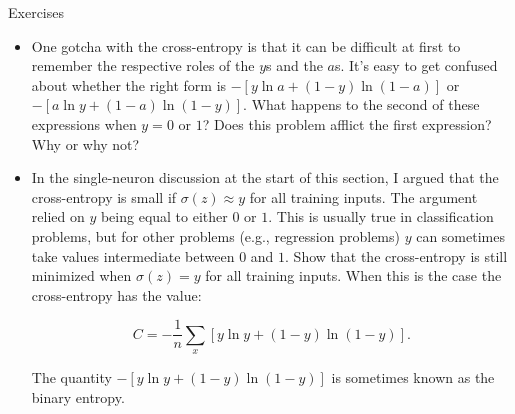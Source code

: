 \begin{exerciseBox}{Exercises}


\begin{itemize}

\item One gotcha with the cross-entropy is that it can be difficult at first to remember the respective roles of the $y$s and the $a$s. It's easy to get confused about whether the right form is $-[y \ln a + (1-y) \ln (1-a)]$ or $-[a \ln y + (1-a) \ln (1-y)]$. What happens to the second of these expressions when $y = 0$ or $1$? Does this problem afflict the first expression? Why or why not?

\item 
In the single-neuron discussion at the start of this section, I argued that the cross-entropy is small if $\sigma(z) \approx y$ for all training inputs. The argument relied on $y$ being equal to either $0$ or $1$. This is usually true in classification problems, but for other problems (e.g., regression problems) $y$ can sometimes take values intermediate between $0$ and $1$. Show that the cross-entropy is still minimized when $\sigma(z) = y$ for all training inputs. When this is the case the cross-entropy has the value:


\begin{equation}
C = -\frac{1}{n} \sum_x [y \ln y+(1-y) \ln(1-y)].
\tag{64}
\end{equation}

The quantity $-[y \ln y+(1-y)\ln(1-y)]$ is sometimes known as the binary entropy.

\end{itemize}

\end{exerciseBox}



